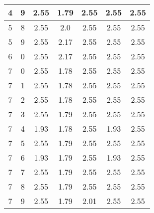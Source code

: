 \begin{longtable}{|c|c||c||c|c||c|c|}
	4 & 9 & 2.55 & 1.79 & 2.55 & 2.55 & 2.55 \\ \hline
	5 & 8 & 2.55 & 2.0 & 2.55 & 2.55 & 2.55 \\ \hline
	5 & 9 & 2.55 & 2.17 & 2.55 & 2.55 & 2.55 \\ \hline
	6 & 0 & 2.55 & 2.17 & 2.55 & 2.55 & 2.55 \\ \hline
	7 & 0 & 2.55 & 1.78 & 2.55 & 2.55 & 2.55 \\ \hline
	7 & 1 & 2.55 & 1.78 & 2.55 & 2.55 & 2.55 \\ \hline
	7 & 2 & 2.55 & 1.78 & 2.55 & 2.55 & 2.55 \\ \hline
	7 & 3 & 2.55 & 1.79 & 2.55 & 2.55 & 2.55 \\ \hline
	7 & 4 & 1.93 & 1.78 & 2.55 & 1.93 & 2.55 \\ \hline
	7 & 5 & 2.55 & 1.79 & 2.55 & 2.55 & 2.55 \\ \hline
	7 & 6 & 1.93 & 1.79 & 2.55 & 1.93 & 2.55 \\ \hline
	7 & 7 & 2.55 & 1.79 & 2.55 & 2.55 & 2.55 \\ \hline
	7 & 8 & 2.55 & 1.79 & 2.55 & 2.55 & 2.55 \\ \hline
	7 & 9 & 2.55 & 1.79 & 2.01 & 2.55 & 2.55 \\ \hline
\end{longtable}
\clearpage{}
